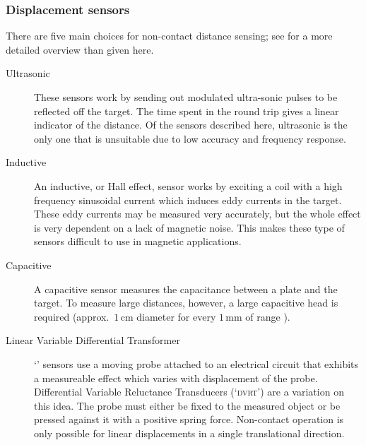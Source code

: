 \documentclass[11pt,a4paper]{memoir}
\begin{document}
\subsubsection{Displacement sensors}

There are five main choices for non-contact distance sensing; see \textcite{boehm1993} for a more detailed overview than given here.
\begin{description}

\item[Ultrasonic]

    These sensors work by sending out modulated
    ultra-sonic pulses to be reflected off the target. The time spent
    in the round trip gives a linear indicator of the
    distance. Of the sensors described here, ultrasonic is the only one
    that is unsuitable due to low accuracy and frequency response.

\item[Inductive]

    An inductive, or Hall effect, sensor works by exciting a coil with a high
    frequency sinusoidal current which induces eddy currents in the target.
    These eddy currents may be measured very accurately, but the whole effect
    is very dependent on a lack of magnetic noise. This makes these type of
    sensors difficult to use in magnetic applications.

\item[Capacitive]

    A capacitive sensor measures the capacitance between a plate and the
    target.
    To measure large distances, however, a large capacitive head is
    required (approx.\ $1$\,cm diameter for every $1$\,mm of range
    \cite{boehm1993}).

\item[Linear Variable Differential Transformer]

    `' sensors use a moving probe attached to an electrical
    circuit that exhibits a measureable effect which varies with displacement
    of the probe.
    Differential Variable Reluctance Transducers
    (`\textsc{dvrt}') are a variation on this idea. The probe must either be
    fixed to the measured object or be pressed against it with a positive
    spring force. Non-contact operation is only possible for linear
    displacements in a single translational direction.


\end{description}
\end{document}
